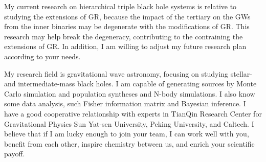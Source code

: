 \documentclass[12pt,a4paper,sans]{article}%
\begin{document}
My current research on hierarchical triple black hole systems is relative to studying the extensions of GR, because the
impact of the tertiary on the GWs from the inner binaries may be degenerate with the modifications of GR. This research
may help break the degeneracy, contributing to the contraining the extensions of GR. In addition, I am willing to adjust my future research plan according to
your needs.

My research field is gravitational wave astronomy, focusing on studying stellar- and intermediate-mass black holes. I am
capable of generating sources by Monte Carlo simulation and population syntheses and N-body simulations. I also know
some data analysis, such Fisher information matrix and Bayesian inference. I have a good cooperative relationship with
experts in TianQin Research Center for Gravitational Physics Sun Yat-sen University, Peking University, and Caltech. I believe that if I am lucky enough to join your team, I can work well with you, benefit from each other, inspire chemistry between us, and enrich your scientific payoff. 



%
\end{document}
